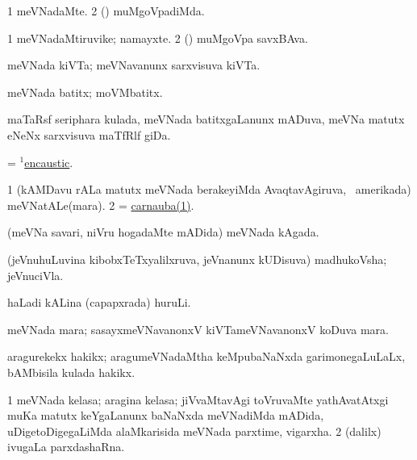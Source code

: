 \bentry
{} 
\gl{\kirxvi}
\expl{}
\bmng
\bnum
\num{1} meVNadaMte. 
\num{2} (\ashi) muMgoVpadiMda. 
\enum
\emng
\eentry

\bentry
{} 
\gl{\nA}
\expl{}
\bmng
\bnum
\num{1} meVNadaMtiruvike; namayxte. 
\num{2} (\ashi) muMgoVpa savxBAva. 
\enum
\emng
\eentry

\bentry
{} 
\gl{\nA}
\expl{}
\bmng
meVNada kiVTa; meVNavanunx sarxvisuva kiVTa. 
\emng
\eentry

\bentry
{} 
\gl{\nA}
\expl{}
\bmng
meVNada batitx; moVMbatitx. 
\emng
\eentry

\bentry
{} 
\gl{\nA}
\expl{}
\bmng
maTaRsf seriphara kulada, meVNada batitxgaLanunx mADuva, meVNa matutx eNeNx sarxvisuva maTfRlf giDa. 
\emng
\eentry

\bentry
{} 
\gl{\nA}
\expl{}
\bmng
= \hyperref{kandict_e.pdf}{E}{encaustic(1)}{$^1$encaustic}. 
\emng
\eentry

\bentry 
{} 
\gl{\nA}
\expl{}
\bmng
\bnum
\num{1} (kAMDavu rALa matutx meVNada berakeyiMda AvaqtavAgiruva, \da\ amerikada) meVNatALe(mara). 
\num{2} = \hyperref{kandict_c.pdf}{C}{carnauba(1)}{carnauba(1)}. 
\enum
\emng
\eentry

\bentry
{} 
\gl{\nA}
\expl{}
\bmng
(meVNa savari, niVru hogadaMte mADida) meVNada kAgada. 
\emng
\eentry

\bentry
{} 
\gl{\nA}
\expl{}
\bmng
(jeVnuhuLuvina kibobxTeTxyalilxruva, jeVnanunx kUDisuva) madhukoVsha; jeVnuciVla. 
\emng
\eentry

\bentry
{} 
\gl{\nA}
\expl{}
\bmng
haLadi kALina (capapxrada) huruLi. 
\emng
\eentry

\bentry
{} 
\gl{\nA}
\expl{}
\bmng
meVNada mara; sasayxmeVNavanonxV kiVTameVNavanonxV koDuva mara. 
\emng
\eentry

\bentry
{} 
\gl{\nA}
\expl{}
\bmng
aragurekekx hakikx; aragumeVNadaMtha keMpubaNaNxda garimonegaLuLaLx, bAMbisila kulada hakikx. 
\emng
\eentry

\bentry
{} 
\gl{\nA}
\expl{}
\bmng
\bnum
\num{1} meVNada kelasa; aragina kelasa; jiVvaMtavAgi toVruvaMte yathAvatAtxgi muKa matutx keYgaLanunx baNaNxda meVNadiMda mADida, uDigetoDigegaLiMda alaMkarisida meVNada parxtime, vigarxha. 
\num{2} (\bava dalilx) ivugaLa parxdashaRna. 
\enum
\emng
\eentry

